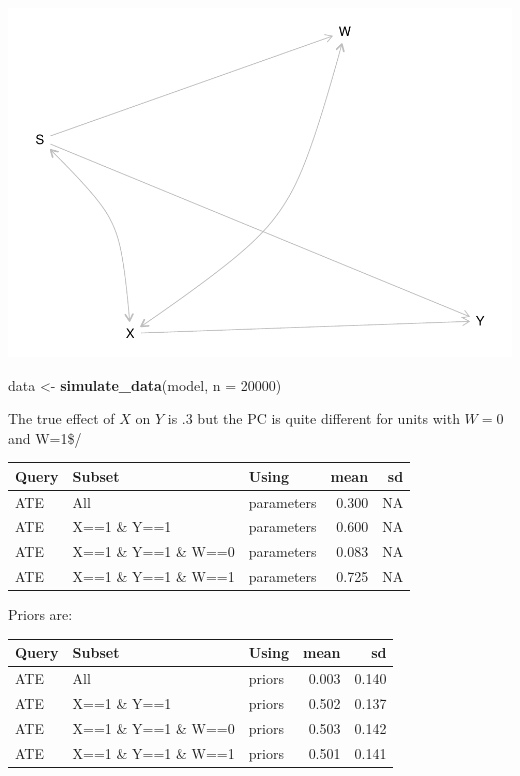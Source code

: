 \documentclass[12pt,]{book}
\newenvironment{Shaded}{\begin{snugshade}}{\end{snugshade}}
\newcommand{\DataTypeTok}[1]{\textcolor[rgb]{0.13,0.29,0.53}{#1}}
\newcommand{\DecValTok}[1]{\textcolor[rgb]{0.00,0.00,0.81}{#1}}
\newcommand{\KeywordTok}[1]{\textcolor[rgb]{0.13,0.29,0.53}{\textbf{#1}}}
\newcommand{\NormalTok}[1]{#1}
\newcommand{\StringTok}[1]{\textcolor[rgb]{0.31,0.60,0.02}{#1}}
\begin{document}
\includegraphics{ii_files/figure-latex/unnamed-chunk-129-1.pdf}

\begin{Shaded}
\begin{Highlighting}[]
\NormalTok{data <-}\StringTok{ }\KeywordTok{simulate_data}\NormalTok{(model, }\DataTypeTok{n =}  \DecValTok{20000}\NormalTok{)}
\end{Highlighting}
\end{Shaded}

The true effect of \(X\) on \(Y\) is .3 but the PC is quite different for units with \(W=0\) and W=1\$/

\begin{tabular}{l|l|l|r|r}
\hline
Query & Subset & Using & mean & sd\\
\hline
ATE & All & parameters & 0.300 & NA\\
\hline
ATE & X==1 \& Y==1 & parameters & 0.600 & NA\\
\hline
ATE & X==1 \& Y==1 \& W==0 & parameters & 0.083 & NA\\
\hline
ATE & X==1 \& Y==1 \& W==1 & parameters & 0.725 & NA\\
\hline
\end{tabular}

Priors are:

\begin{tabular}{l|l|l|r|r}
\hline
Query & Subset & Using & mean & sd\\
\hline
ATE & All & priors & 0.003 & 0.140\\
\hline
ATE & X==1 \& Y==1 & priors & 0.502 & 0.137\\
\hline
ATE & X==1 \& Y==1 \& W==0 & priors & 0.503 & 0.142\\
\hline
ATE & X==1 \& Y==1 \& W==1 & priors & 0.501 & 0.141\\
\hline
\end{tabular}
\end{document}
